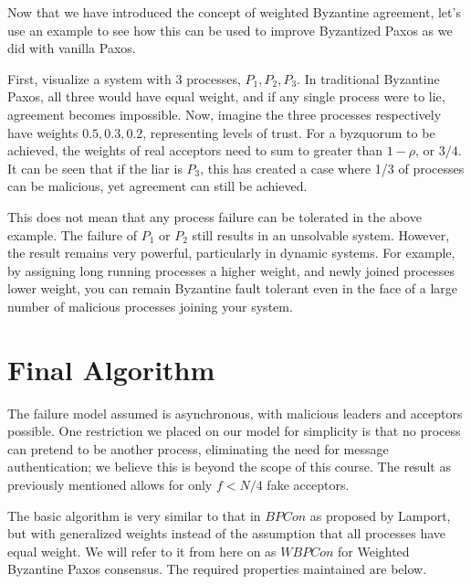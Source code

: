 \documentclass[conference]{IEEEtran}
\begin{document}
Now that we have introduced the concept of weighted Byzantine agreement, let's use an example to see how this can be used to improve Byzantized Paxos as we did with vanilla Paxos.

First, visualize a system with 3 processes, ${P_1, P_2, P_3}$. In traditional Byzantine Paxos, all three would have equal weight, and if any single process were to lie, agreement becomes impossible. Now, imagine the three processes respectively have weights ${0.5, 0.3, 0.2}$, representing levels of trust. For a byzquorum to be achieved, the weights of real acceptors need to sum to greater than $1 - \rho$, or $3/4$. It can be seen that if the liar is $P_3$, this has created a case where 1/3 of processes can be malicious, yet agreement can still be achieved. 

This does not mean that any process failure can be tolerated in the above example. The failure of $P_1$ or $P_2$ still results in an unsolvable system. However, the result remains very powerful, particularly in dynamic systems. For example, by assigning long running processes a higher weight, and newly joined processes lower weight, you can remain Byzantine fault tolerant even in the face of a large number of malicious processes joining your system.

\section{Final Algorithm}
The failure model assumed is asynchronous, with malicious leaders and acceptors possible. One restriction we placed on our model for simplicity is that no process can pretend to be another process, eliminating the need for message authentication; we believe this is beyond the scope of this course. The result as previously mentioned allows for only $f < N/4$ fake acceptors.

The basic algorithm is very similar to that in $BPCon$ as proposed by Lamport, but with generalized weights instead of the assumption that all processes have equal weight. We will refer to it from here on as $WBPCon$ for Weighted Byzantine Paxos consensus. The required properties maintained are below.
\end{document}
